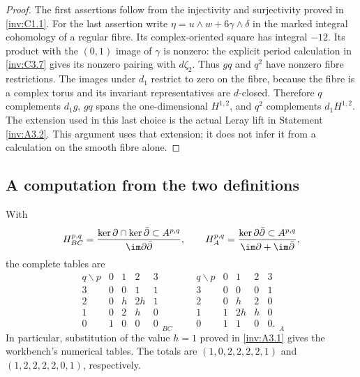 \begin{proof}
The first assertions follow from the injectivity and surjectivity
proved in \ref{inv:C1.1}.  For the last assertion write
$\eta=u\wedge w+6\gamma\wedge\delta$ in the marked integral
cohomology of a regular fibre.  Its complex-oriented square has
integral $-12$.  Its product with the $(0,1)$ image of $\gamma$ is
nonzero: the explicit period calculation in \ref{inv:C3.7} gives its nonzero
pairing with $d\zeta_2$.  Thus $gq$ and $q^2$ have nonzero fibre
restrictions.  The images under $d_1$ restrict to zero on the fibre,
because the fibre is a complex torus and its invariant representatives
are $d$-closed.  Therefore $q$ complements $d_1g$, $gq$ spans the
one-dimensional $H^{1,2}$, and $q^2$ complements $d_1H^{1,2}$.
The extension used in this last choice is the actual Leray lift in
Statement \ref{inv:A3.2}.  This argument uses that extension; it does not infer
it from a calculation on the smooth fibre alone.
\end{proof}

\subsection{A computation from the two definitions}

\begin{proposition}\label{inv:C2.1}\label{wb:thm:exact-bott-chern-aeppli}
With
\[
H^{p,q}_{BC}=
\frac{\ker\partial\cap\ker\bar\partial\subset A^{p,q}}
{\im\partial\bar\partial},\qquad
H^{p,q}_{A}=
\frac{\ker\partial\bar\partial\subset A^{p,q}}
{\im\partial+\im\bar\partial},
\]
the complete tables are
\begin{equation}\label{inv:eq:C-BC-A}
\begin{array}{c|rrrr}
q\backslash p&0&1&2&3\\\hline
3&0&0&1&1\\
2&0&h&2h&1\\
1&0&2&h&0\\
0&1&0&0&0
\end{array}_{BC}
\qquad
\begin{array}{c|rrrr}
q\backslash p&0&1&2&3\\\hline
3&0&0&0&1\\
2&0&h&2&0\\
1&1&2h&h&0\\
0&1&1&0&0.
\end{array}_{A}
\end{equation}
In particular, substitution of the value $h=1$ proved in \ref{inv:A3.1} gives
the workbench's numerical tables.  The totals are
$(1,0,2,2,2,2,1)$ and $(1,2,2,2,2,0,1)$, respectively.
\end{proposition}

